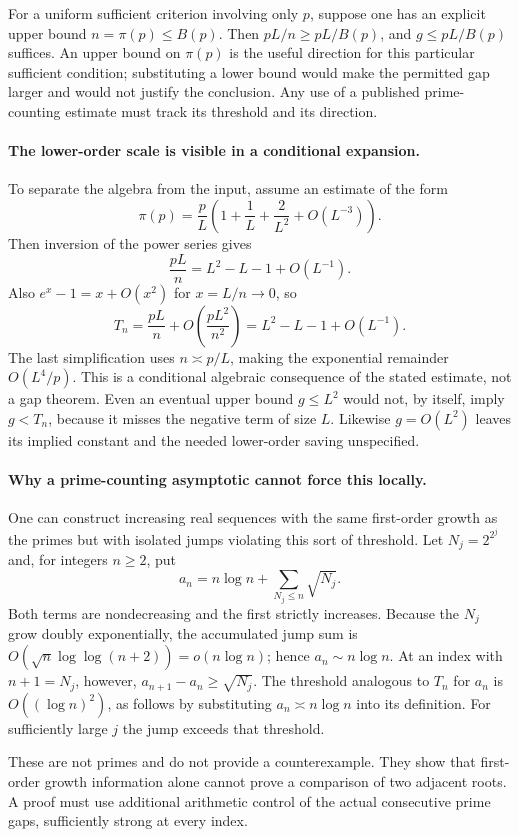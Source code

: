 \documentclass[11pt,a4paper]{article}
\begin{document}
For a uniform sufficient criterion involving only $p$, suppose one
has an explicit upper bound $n=\pi(p)\le B(p)$. Then
$pL/n\ge pL/B(p)$, and $g\le pL/B(p)$ suffices. An upper bound on
$\pi(p)$ is the useful direction for this particular sufficient
condition; substituting a lower bound would make the permitted gap
larger and would not justify the conclusion. Any use of a published
prime-counting estimate must track its threshold and its direction.

\paragraph{The lower-order scale is visible in a conditional expansion.}
To separate the algebra from the input, assume an estimate of the form
\[
 \pi(p)=\frac pL\left(1+\frac1L+\frac2{L^2}
                    +O(L^{-3})\right).
\]
Then inversion of the power series gives
\[
 \frac{pL}{n}=L^2-L-1+O(L^{-1}).
\]
Also $e^x-1=x+O(x^2)$ for $x=L/n\to0$, so
\[
 T_n=\frac{pL}{n}+O\!\left(\frac{pL^2}{n^2}\right)
     =L^2-L-1+O(L^{-1}).
\]
The last simplification uses $n\asymp p/L$, making the exponential
remainder $O(L^4/p)$. This is a conditional algebraic consequence of
the stated estimate, not a gap theorem. Even an eventual upper bound
$g\le L^2$ would not, by itself, imply $g<T_n$, because it misses
the negative term of size $L$. Likewise $g=O(L^2)$ leaves its implied
constant and the needed lower-order saving unspecified.

\paragraph{Why a prime-counting asymptotic cannot force this locally.}
One can construct increasing real sequences with the same first-order
growth as the primes but with isolated jumps violating this sort of
threshold. Let $N_j=2^{2^j}$ and, for integers $n\ge2$, put
\[
 a_n=n\log n+\sum_{N_j\le n}\sqrt{N_j}.
\]
Both terms are nondecreasing and the first strictly increases. Because
the $N_j$ grow doubly exponentially, the accumulated jump sum is
$O(\sqrt n\log\log(n+2))=o(n\log n)$; hence $a_n\sim n\log n$.
At an index with $n+1=N_j$, however,
$a_{n+1}-a_n\ge\sqrt{N_j}$. The threshold analogous to $T_n$ for
$a_n$ is $O((\log n)^2)$, as follows by substituting
$a_n\asymp n\log n$ into its definition. For sufficiently large $j$
the jump exceeds that threshold.

These are not primes and do not provide a counterexample. They show
that first-order growth information alone cannot prove a comparison of
two adjacent roots. A proof must use additional arithmetic control of
the actual consecutive prime gaps, sufficiently strong at every index.
\end{document}
